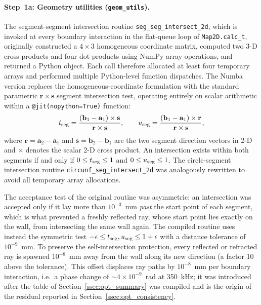             \paragraph*{Step~1a: Geometry utilities (\texttt{geom\_utils}).}
            The segment-segment intersection routine \texttt{seg\_seg\_intersect\_2d}, which is invoked at every boundary interaction in the flat-queue loop of \texttt{Map2D.calc\_t}, originally constructed a $4 \times 3$ homogeneous coordinate matrix, computed two 3-D cross products and four dot products using NumPy array operations, and returned a Python object. Each call therefore allocated at least four temporary arrays and performed multiple Python-level function dispatches. The Numba version replaces the homogeneous-coordinate formulation with the standard parametric $\mathbf{r} \times \mathbf{s}$ segment intersection test, operating entirely on scalar arithmetic within a \texttt{@jit(nopython=True)} function:
            \begin{equation}
                t_{\rm seg} = \frac{(\mathbf{b}_1 - \mathbf{a}_1) \times \mathbf{s}}
                                   {\mathbf{r} \times \mathbf{s}}, \qquad
                u_{\rm seg} = \frac{(\mathbf{b}_1 - \mathbf{a}_1) \times \mathbf{r}}
                                   {\mathbf{r} \times \mathbf{s}},
                \label{eq:seg_intersect_numba}
            \end{equation}
            where $\mathbf{r} = \mathbf{a}_2 - \mathbf{a}_1$ and $\mathbf{s} = \mathbf{b}_2 - \mathbf{b}_1$ are the two segment direction vectors in 2-D and $\times$ denotes the scalar 2-D cross product. An intersection exists within both segments if and only if $0 \le t_{\rm seg} \le 1$ and $0 \le u_{\rm seg} \le 1$. The circle-segment intersection routine \texttt{circunf\_seg\_intersect\_2d} was analogously rewritten to avoid all temporary array allocations.

            The acceptance test of the original routine was asymmetric: an intersection was accepted only if it lay more than $10^{-3}$~mm \emph{past} the start point of each segment, which is what prevented a freshly reflected ray, whose start point lies exactly on the wall, from intersecting the same wall again. The compiled routine uses instead the symmetric test $-\epsilon \le t_{\rm seg}, u_{\rm seg} \le 1 + \epsilon$ with a distance tolerance of $10^{-9}$~mm. To preserve the self-intersection protection, every reflected or refracted ray is spawned $10^{-8}$~mm away from the wall along its new direction (a factor 10 above the tolerance). This offset displaces ray paths by $10^{-8}$~mm per boundary interaction, i.e.\ a phase change of $\sim 4\times10^{-9}$~rad at \SI{350}{\kilo\hertz}; it was introduced after the table of Section~\ref{ssec:opt_summary} was compiled and is the origin of the residual reported in Section~\ref{ssec:opt_consistency}.

